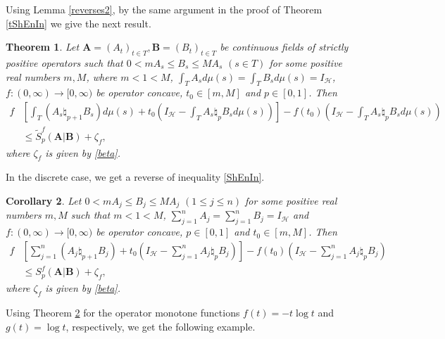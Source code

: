\documentclass[12pt, reqno]{amsart}
\newtheorem{theorem}{Theorem}[section]
\newtheorem{corollary}[theorem]{Corollary}
\theoremstyle{definition}
\theoremstyle{remark}
\numberwithin{equation}{section}
\begin{document}
Using Lemma \ref{reverses2}, by the same argument in the proof of Theorem \ref{tShEnIn} we give the next result.
\begin{theorem}\label{tShEnIn34545}
Let $\mathbf{A}=(A_t)_{t\in T},\mathbf{B}=(B_t)_{t\in T}$ be continuous fields of strictly positive operators such that  $0<m A_s \leq B_s \leq M A_s\,\,(s\in T)$  for some positive real numbers $m, M$, where $m<1<M$,  $\int_TA_sd\mu(s)=\int_TB_sd\mu(s)=I_{\mathscr H}$, $f: (0,\infty) \to [0,\infty)$ be  operator
concave, $t_0\in[m,M]$ and $p\in[0,1]$. Then
{\footnotesize
\begin{align}\label{ShEnInre}
f&\left[\int_T(A_s\natural_{p+1}B_s)d\mu(s)+t_0\left(I_{\mathscr H}-\int_TA_s\natural_pB_sd\mu(s)\right)\right]-f(t_0)\left(I_{\mathscr H}-\int_TA_s\natural_pB_sd\mu(s)\right)\nonumber\\
&\le \widetilde{S}_p^f(\mathbf{A}|\mathbf{B})+\zeta_f,
\end{align}}
where $\zeta_f$ is given by \eqref{beta}.
\end{theorem}
In the discrete case, we get a reverse of  inequality \eqref{ShEnIn}.
\begin{corollary}\label{tShEnIn345}
Let  $0<m A_j \leq B_j \leq M A_j\,\,(1\leq j\leq n)$  for some positive real numbers $m, M$  such that $m<1<M$,  $\sum_{j=1}^nA_j=\sum_{j=1}^nB_j=I_{\mathscr H}$ and $f: (0,\infty) \to [0,\infty)$ be  operator concave, $p\in[0,1]$ and $t_0\in[m,M]$. Then
\begin{align}\label{ShEnInre}
f&\left[\sum_{j=1}^n(A_j\natural_{p+1}B_j)+t_0\left(I_{\mathscr H}-\sum_{j=1}^nA_j\natural_pB_j\right)\right]-f(t_0)\left(I_{\mathscr H}-\sum_{j=1}^nA_j\natural_pB_j\right)\nonumber\\
&\le S_p^f(\mathbf{A}|\mathbf{B})+\zeta_f,
\end{align}
where $\zeta_f$ is given by \eqref{beta}.
\end{corollary}
Using Theorem \ref{tShEnIn345} for the operator monotone functions $f(t)=-t\log t$ and $g(t)=\log t$, respectively, we get the following example.
\end{document}
